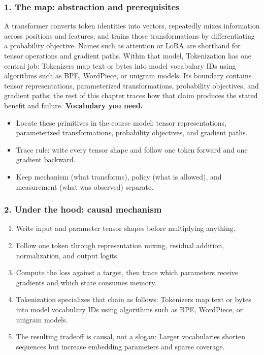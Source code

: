\subsubsection*{1. The map: abstraction and prerequisites}
A transformer converts token identities into vectors, repeatedly mixes information across positions and features, and trains those transformations by differentiating a probability objective. Names such as attention or LoRA are shorthand for tensor operations and gradient paths.
Within that model, Tokenization has one central job: Tokenizers map text or bytes into model vocabulary IDs using algorithms such as BPE, WordPiece, or unigram models. Its boundary contains tensor representations, parameterized transformations, probability objectives, and gradient paths; the rest of this chapter traces how that claim produces the stated benefit and failure.
\textbf{Vocabulary you need.}\begin{itemize}
\item Locate these primitives in the course model: tensor representations, parameterized transformations, probability objectives, and gradient paths.
\item Trace rule: write every tensor shape and follow one token forward and one gradient backward.
\item Keep mechanism (what transforms), policy (what is allowed), and measurement (what was observed) separate.
\end{itemize}
\subsubsection*{2. Under the hood: causal mechanism}\begin{enumerate}
\item Write input and parameter tensor shapes before multiplying anything.
\item Follow one token through representation mixing, residual addition, normalization, and output logits.
\item Compute the loss against a target, then trace which parameters receive gradients and which state consumes memory.
\item Tokenization specializes that chain as follows: Tokenizers map text or bytes into model vocabulary IDs using algorithms such as BPE, WordPiece, or unigram models.
\item The resulting tradeoff is causal, not a slogan: Larger vocabularies shorten sequences but increase embedding parameters and sparse coverage.
\end{enumerate}
